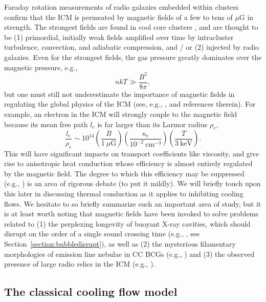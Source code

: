 Faraday rotation measurements of radio galaxies embedded within clusters confirm that the ICM 
is permeated by magnetic fields of a few to tens of $\mu$G in strength. 
The strongest fields are found in cool core clusters \citep{clarke01}, and are thought to be 
(1) primordial, initially weak fields amplified over time by intracluster turbulence, convection, and 
adiabatic compression, and / or (2) injected by radio galaxies. Even for the strongest fields, 
the gas pressure greatly dominates over the magnetic pressure, e.g., 
\begin{equation}
nkT \gg \frac{B^2}{8\pi},
\end{equation}
but one must still not underestimate the importance of magnetic fields in regulating the global physics of the ICM (see, e.g., \citealt{soker10}, and references therein). For example, an
electron in the ICM will strongly couple to the magnetic field because its mean free path $l_e$ is far larger 
than its Larmor radius $\rho_e$, 
\begin{equation}
\frac{l_e}{\rho_e} \sim 10^{14} \left( \frac{B}{1~\mu\mathrm{G}} \right) \left(\frac{n_e}{10^{-2}~\mathrm{cm}^{-3}} \right) \left( \frac{T}{3~\mathrm{keV}} \right).
\end{equation}
This will have 
significant impacts on transport coefficients like viscosity, and give rise to anisotropic 
heat conduction whose efficiency is almost entirely regulated by the magnetic field. 
The degree to which this efficiency may be suppressed (e.g., \citealt{tribble89}) is an area of rigorous debate
(to put it mildly). We will briefly touch upon this later in discussing thermal conduction as it applies to inhibiting cooling flows. 
We hesitate to so briefly summarize such an important area of study, but it is at least worth noting that magnetic 
fields have been invoked to solve problems related to (1) the perplexing longevity of buoyant X-ray cavities, which should 
disrupt on the order of a single sound crossing time (e.g., \citealt{dursi08}, see Section~\ref{section:bubbledisrupt}), as well as (2) the mysterious filamentary morphologies of emission line nebulae in CC BCGs (e.g., \citealt{fabian08}) and (3) the observed presence of large radio relics in the ICM (e.g., \citealt{markevitch05}). 






\subsection{The classical cooling flow model}
\label{section:coolingflows}



